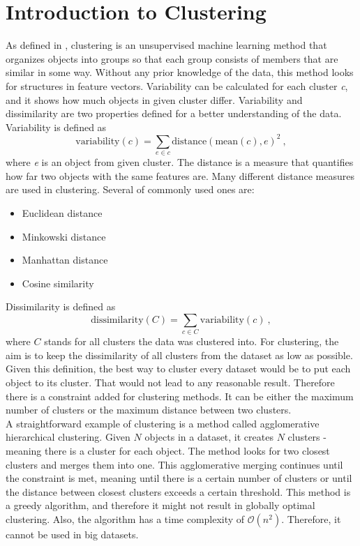 \documentclass[thesis=B,english]{FITthesis}[2012/10/20]
\begin{document}
\section{Introduction to Clustering}\label{sec:clust_intro}
As defined in \cite{guttag2016introduction}, clustering is an unsupervised machine learning method that organizes objects into groups so that each group consists of members that are similar in some way.
Without any prior knowledge of the data, this method looks for structures in feature vectors.
Variability can be calculated for each cluster \textit{c}, and it shows how much objects in given cluster differ.
Variability and dissimilarity are two properties defined for a better understanding of the data. \\
Variability is defined as $$ \mathrm{variability}(c) = \sum_{e \in c} \mathrm{distance}(\mathrm{mean}(c), e)^2\:,$$ where \textit{e} is an object from given cluster.
The distance is a measure that quantifies how far two objects with the same features are. 
Many different distance measures are used in clustering.
Several of commonly used ones are:
\begin{itemize}
    \item Euclidean distance
    \item Minkowski distance
    \item Manhattan distance
    \item Cosine similarity
\end{itemize}

Dissimilarity is defined as $$ \mathrm{dissimilarity}(C) = \sum_{c \in C} \mathrm{variability}(c)\:,$$ where $C$ stands for all clusters the data was clustered into.
For clustering, the aim is to keep the dissimilarity of all clusters from the dataset as low as possible.
Given this definition, the best way to cluster every dataset would be to put each object to its cluster.
That would not lead to any reasonable result.
Therefore there is a constraint added for clustering methods.
It can be either the maximum number of clusters or the maximum distance between two clusters. \\

A straightforward example of clustering is a method called agglomerative hierarchical clustering.
Given $N$ objects in a dataset, it creates $N$ clusters - meaning there is a cluster for each object.
The method looks for two closest clusters and merges them into one.
This agglomerative merging continues until the constraint is met, meaning until there is a certain number of clusters or until the distance between closest clusters exceeds a certain threshold.
This method is a greedy algorithm, and therefore it might not result in globally optimal clustering.
Also, the algorithm has a time complexity of $\mathcal{O}(n^2)$.
Therefore, it cannot be used in big datasets. \\
\end{document}
